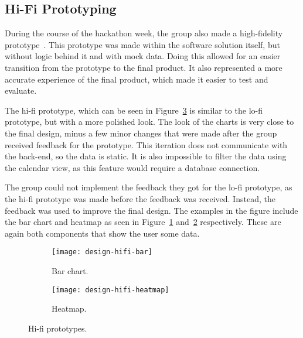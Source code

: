 \subsection{Hi-Fi Prototyping}\label{subsec:hi-fi-prototyping}

During the course of the hackathon week, the group also made a high-fidelity prototype~\cite{hi-lo-fidelity}.
This prototype was made within the software solution itself, but without logic behind it and with mock data.
Doing this allowed for an easier transition from the prototype to the final product.
It also represented a more accurate experience of the final product, which made it easier to test and evaluate.

The hi-fi prototype, which can be seen in Figure~\ref{fig:hifi-prototype} is similar to the lo-fi prototype, but with a
more polished look.
The look of the charts is very close to the final design, minus a few minor changes that were made after the group
received feedback for the prototype.
This iteration does not communicate with the back-end, so the data is static.
It is also impossible to filter the data using the calendar view, as this feature would require a database connection.

The group could not implement the feedback they got for the lo-fi prototype, as the hi-fi prototype was made before
the feedback was received.
Instead, the feedback was used to improve the final design.
The examples in the figure include the bar chart and heatmap as seen in Figure~\ref{subfig:hifi-bar}
and~\ref{subfig:hifi-heatmap} respectively.
These are again both components that show the user some data.

\begin{figure}[H]
    \centering
    \begin{subfigure}{.75\textwidth}
        \centering
        \texttt{[image: design-hifi-bar]}
        \caption{Bar chart.
        }\label{subfig:hifi-bar}
    \end{subfigure}
    \par\medskip
    \begin{subfigure}{.75\textwidth}
        \centering
        \texttt{[image: design-hifi-heatmap]}
        \caption{Heatmap.
        }\label{subfig:hifi-heatmap}
    \end{subfigure}
    \caption{Hi-fi prototypes.
    }\label{fig:hifi-prototype}
\end{figure}
